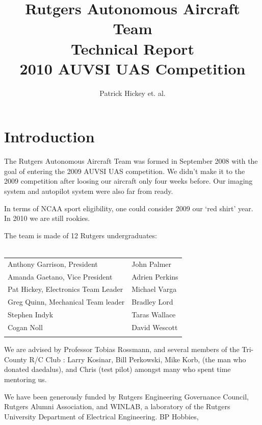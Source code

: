 \documentclass[10pt]{report}
\begin{document}
\title{Rutgers Autonomous Aircraft Team\\Technical Report\\2010 AUVSI UAS Competition}
\author{Patrick Hickey et. al.}



\section{Introduction}

The Rutgers Autonomous Aircraft Team was formed in September 2008 with the goal of entering the 2009 AUVSI UAS competition. We didn't make it to the 2009 competition after loosing our aircraft only four weeks before. Our imaging system and autopilot system were also far from ready. 

In terms of NCAA sport eligibility, one could consider 2009 our `red shirt' year. In 2010 we are still rookies.

The team is made of 12 Rutgers undergraduates:\\
\\ \begin{tabular}{l l}
Anthony Garrison, President & John Palmer \\
Amanda Gaetano, Vice President & Adrien Perkins\\
Pat Hickey, Electronics Team Leader & Michael Varga\\
Greg Quinn, Mechanical Team leader & Bradley Lord\\
Stephen Indyk & Taras Wallace\\ 
Cogan Noll & David Wescott\\ \\
\end{tabular}

We are advised by
 Professor Tobias Rossmann,
 and several members of the Tri-County R/C Club \cite{tricountyRC}:
 Larry Kosinar,
 Bill Perkowski,
 Mike Korb,
 (the man who donated daedalus), and
 Chris (test pilot) amongst many who spent time mentoring us.

We have been generously funded by 
Rutgers Engineering Governance Council,
Rutgers Alumni Association, and
WINLAB, a laboratory of the Rutgers University Department of Electrical Engineering.
BP Hobbies, 
\end{document}
